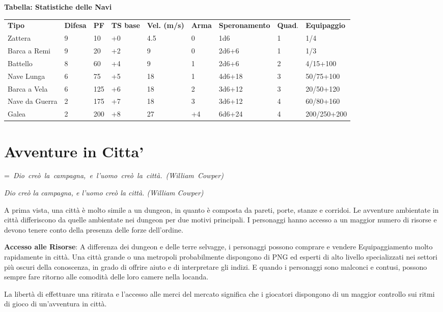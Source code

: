\documentclass[a4paper,11pt,twoside,openany]{book}
\makeatletter
\newcommand{\mybox}[1]{%
	\setbox0=\hbox{#1}%
	\setlength{\@tempdima}{\dimexpr\wd0+13pt}%
	\begin{tcolorbox}[boxrule=0.5pt,arc=4pt, breakable,enhanced,
		left=6pt,right=6pt,top=6pt,bottom=6pt,boxsep=0pt,width=\@tempdima]
		#1
	\end{tcolorbox}
}
\makeatother
\begin{document}
{\bigskip

\textbf{Tabella: Statistiche delle Navi}

\medskip

\begin{tabular}{L{2cm} L{1cm} L{1cm} L{1cm} L{1.5cm} L{1cm} L{2cm} L{1cm} L{2cm}}
\toprule
\textbf{Tipo} & \textbf{Difesa} & \textbf{PF} & \textbf{TS base} & \textbf{Vel. (m/s)} & \textbf{Arma} & \textbf{Speronamento} & \textbf{Quad}. & \textbf{Equipaggio}\tabularnewline
Zattera & 9 & 10 & +0 & 4.5 & 0 & 1d6 & 1 & 1/4\tabularnewline
Barca a Remi & 9 & 20 & +2 & 9 & 0 & 2d6+6 & 1 & 1/3\tabularnewline
Battello & 8 & 60 & +4 & 9 & 1 & 2d6+6 & 2 & 4/15+100\tabularnewline
Nave Lunga & 6 & 75 & +5 & 18 & 1 & 4d6+18 & 3 & 50/75+100\tabularnewline
Barca a Vela & 6 & 125 & +6 & 18 & 2 & 3d6+12 & 3 & 20/50+120\tabularnewline
Nave da Guerra & 2 & 175 & +7 & 18 & 3 & 3d6+12 & 4 & 60/80+160\tabularnewline
Galea & 2 & 200 & +8 & 27 & +4 & 6d6+24 & 4 & 200/250+200\tabularnewline
\end{tabular}

\pagebreak

\section{Avventure in Citta'}

\label{avventure-in-citta}
\mybox{\textit{
Dio creò la campagna, e l'uomo creò la città. (William Cowper)
}}\medskip

A prima vista, una città è molto simile a un dungeon, in quanto è composta da pareti, porte, stanze e corridoi. Le avventure ambientate in città differiscono da quelle ambientate nei dungeon per due motivi principali. I personaggi hanno accesso a un maggior numero di risorse e devono tenere conto della presenza delle forze dell'ordine.

\textbf{Accesso alle Risorse}: A differenza dei dungeon e delle terre selvagge, i personaggi possono comprare e vendere Equipaggiamento molto rapidamente in città. Una città grande o una metropoli probabilmente dispongono di PNG ed esperti di alto livello specializzati nei settori più oscuri della conoscenza, in grado di offrire aiuto e di interpretare gli indizi. E quando i personaggi sono malconci e contusi, possono sempre fare ritorno alle comodità delle loro camere nella locanda.

La libertà di effettuare una ritirata e l'accesso alle merci del mercato significa che i giocatori dispongono di un maggior controllo sui ritmi di gioco di un'avventura in città.

}
\end{document}
